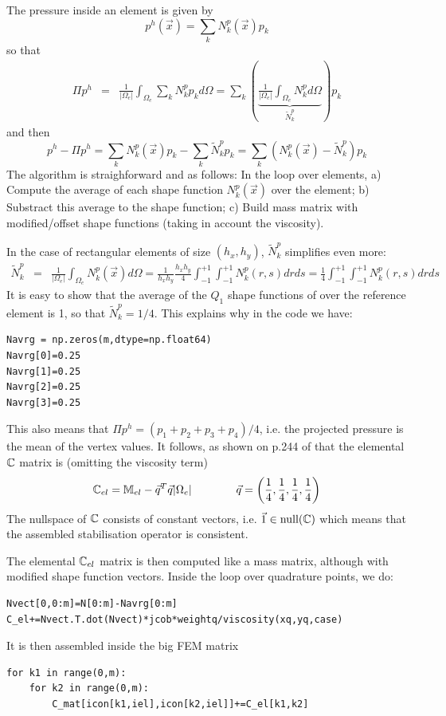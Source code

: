 The pressure inside an element is given by 
\[
p^h(\vec x) = \sum_k N_k^p(\vec x) p_k
\]
so that 
\begin{eqnarray}
\Pi p^h 
&=& \frac{1}{|\Omega_e|} \int_{\Omega_e} \sum_k N_k^p p_k d\Omega 
= \sum_k \left(\underbrace{\frac{1}{|\Omega_e|} \int_{\Omega_e} N_k^p  d\Omega}_{\tilde{N}_k^p} \right) p_k
\end{eqnarray}
and then
\[
p^h -\Pi p^h 
= \sum_k N_k^p(\vec x) p_k - \sum_k \tilde{N}_k^p p_k  
= \sum_k (N_k^p(\vec x) - \tilde{N}_k^p) p_k  
\]
The algorithm is straighforward and as follows:
In the loop over elements, a) Compute the average of each shape function $N_k^p(\vec x)$ over the element;
b) Substract this average to the shape function; c) Build mass matrix with modified/offset shape functions
(taking in account the viscosity).
 
In the case of rectangular elements of size $(h_x,h_y)$, $\tilde{N}_k^p$ simplifies even more:
\begin{eqnarray}
\tilde{N}_k^p 
&=& \frac{1}{|\Omega_e|} \int_{\Omega_e} N_k^p(\vec x)   d\Omega  
= \frac{1}{h_xh_y} \frac{h_xh_y}{4} \int_{-1}^{+1} \int_{-1}^{+1} N_k^p(r,s)   drds 
= \frac{1}{4} \int_{-1}^{+1} \int_{-1}^{+1} N_k^p(r,s)   drds 
\end{eqnarray}
It is easy to show that the average of the $Q_1$ shape functions of over the reference 
element is 1, so that $ \tilde{N}_k^p=1/4$. 
This explains why in the code we have:
\begin{lstlisting}
Navrg = np.zeros(m,dtype=np.float64)
Navrg[0]=0.25
Navrg[1]=0.25
Navrg[2]=0.25
Navrg[3]=0.25
\end{lstlisting}
This also means that $\Pi p^h = (p_1+p_2+p_3+p_4)/4$, i.e. the projected pressure
is the mean of the vertex values. It follows, as shown on p.244 of \cite{elsw} that 
the elemental ${\mathbb{C}}$ matrix is (omitting the viscosity term)
\[
{\mathbb{C}}_{el} = \mathbb{M}_{el} - \vec q^T \vec q |\Omega_e| \qquad\qquad 
\vec q=\left(\frac{1}{4},\frac{1}{4},\frac{1}{4},\frac{1}{4} \right)
\]
The nullspace of ${\mathbb{C}}$ consists of constant vectors, i.e. $\vec 1 \in \text{null}({\mathbb{C}})$ which means
that the assembled stabilisation operator is consistent.

The elemental ${\mathbb{C}}_{el}$ matrix is then computed like a mass matrix, although with modified 
shape function vectors. Inside the loop over quadrature points, we do:
\begin{lstlisting}
Nvect[0,0:m]=N[0:m]-Navrg[0:m]
C_el+=Nvect.T.dot(Nvect)*jcob*weightq/viscosity(xq,yq,case)
\end{lstlisting}
It is then assembled inside the big FEM matrix 
\begin{lstlisting}
for k1 in range(0,m):
    for k2 in range(0,m):
        C_mat[icon[k1,iel],icon[k2,iel]]+=C_el[k1,k2] 
\end{lstlisting}

